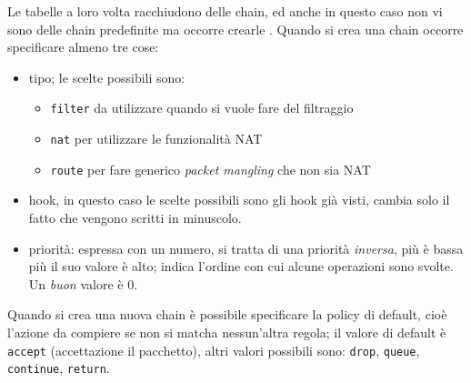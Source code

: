 Le tabelle a loro volta racchiudono delle chain, ed anche in questo caso non vi
sono delle chain predefinite ma occorre crearle \cite{nftables-chains}. Quando si crea una chain occorre
specificare
almeno tre cose:
\begin{itemize}
	\item tipo; le scelte possibili sono:
	      \begin{itemize}
	      	\item \texttt{filter} da utilizzare quando si vuole fare del filtraggio
	      	\item \texttt{nat} per utilizzare le funzionalità NAT
	      	\item \texttt{route} per fare generico \textit{packet mangling} che non sia NAT
	      \end{itemize}
	\item hook, in questo caso le scelte possibili sono gli hook già visti, cambia solo
	      il fatto che vengono scritti in minuscolo.
	\item priorità: espressa con un numero, si tratta di una priorità \textit{inversa},
	      più è bassa più il suo valore è alto; indica l'ordine con cui alcune operazioni
	      sono svolte. Un \textit{buon} valore è 0.
\end{itemize}

Quando si crea una nuova chain è possibile specificare la policy di default, cioè
l'azione da compiere se non si matcha nessun'altra regola; il valore di default è
\texttt{accept} (accettazione il pacchetto), altri valori possibili sono: \texttt{drop},
\texttt{queue}, \texttt{continue}, \texttt{return}.


